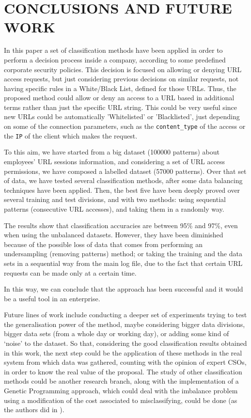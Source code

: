 \documentclass{llncs}
\begin{document}
\section{\uppercase{Conclusions and Future Work}}
\label{sec:conclusions}

\noindent In this paper a set of classification methods have been applied
in order to perform a decision process inside a company, according to
some predefined corporate security policies. 
This decision is focused on allowing or denying URL access requests, but just considering previous decisions on similar requests, not having specific rules in a White/Black List, defined for those URLs. Thus, the proposed method could allow or deny an access to a URL based in additional terms rather than just the specific URL string. This could be very useful since new URLs could be automatically 'Whitelisted' or 'Blacklisted', just depending on some of the connection parameters, such as the \texttt{content\_type} of the access or the \texttt{IP} of the client which makes the request.

To this aim, we have started from a big dataset (100000 patterns) about employees' URL sessions information, and considering a set of URL access permissions, we have composed a labelled dataset (57000 patterns). Over that set of data, we have tested several classification methods, after some data balancing techniques have been applied. Then, the best five have been deeply proved over several training and test divisions, and with two methods: using sequential patterns (consecutive URL accesses), and taking them in a randomly way.

The results show that classification accuracies are between 95\% and 97\%, even when using the unbalanced datasets. However, they have been diminished because of the possible loss of data that comes from performing an undersampling (removing patterns) method; or taking the training and the data sets in a sequential way from the main log file, due to the fact that certain URL requests can be made only at a certain time.

In this way, we can conclude that the approach has been successful and it would be a useful tool in an enterprise.

Future lines of work include conducting a deeper set of experiments trying to test the generalisation power of the method, maybe considering bigger data divisions, bigger data sets (from a whole day or working day), or adding some kind of `noise' to the dataset.
So that, considering the good classification results obtained in this work, the next step could be the application of these methods in the real system from which data was gathered, counting with the opinion of expert CSOs, in order to know the real value of the proposal.
The study of other classification methods could be another research branch, along with the implementation of a Genetic Programming approach, which could deal with the imbalance problem using a modification of the cost associated to misclassifying, could be done (as the authors did in \cite{cost_adjustment_07}).
\end{document}
